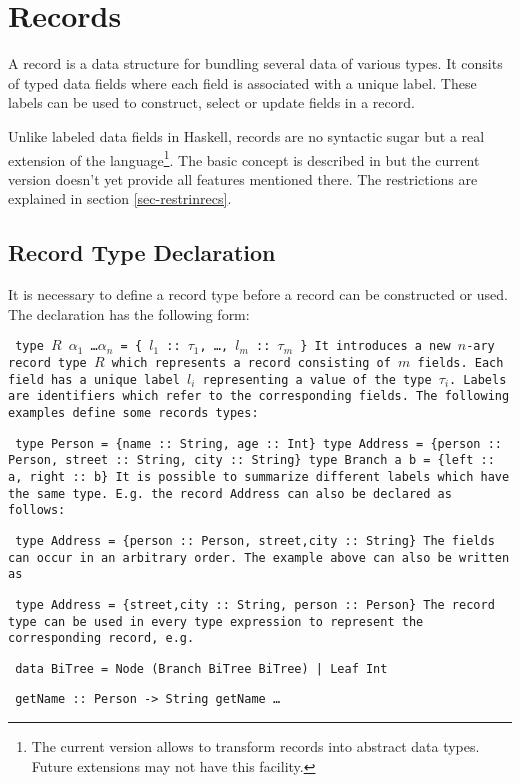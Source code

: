 \documentclass[11pt,fleqn]{article}
\makeatletter
\newenvironment{prog}{\par\vspace{1.5ex}
\setlength{\parindent}{1.0cm}
\setlength{\parskip}{-0.1ex}
\obeylines\@vobeyspaces\tt}{\vspace{1.5ex}\noindent
}
\newcommand{\startprog}{\begin{prog}}
\newcommand{\stopprog}{\end{prog}\noindent}
\newcommand{\pr}[1]{\mbox{\tt #1}}   %
\makeatother
\begin{document}

\section {Records}
\label{records}

A record is a data structure for bundling several data of various types.
It consits of typed data fields where each field is associated with
a unique label. These labels can be used to construct, select or update
fields in a record.


Unlike labeled data fields in Haskell, records are 
no syntactic sugar but a real extension of the
language\footnote{
  The current version allows to transform records
  into abstract data types. Future extensions may not have
  this facility.}.
The basic concept is described in \cite{Leijen05} but the current
version doesn't yet provide all features mentioned there. 
The restrictions are explained in section \ref{sec-restrinrecs}.

 
\subsection{Record Type Declaration}
\label{sec-recordtypedecl}

It is necessary to define a record type before a record
can be constructed or used. The declaration has the following form:
\startprog
type $R$ $\alpha_1$ \ldots $\alpha_n$ = \{ $l_1$ :: $\tau_1$, \ldots, $l_m$ :: $\tau_m$ \}
\stopprog
It introduces a new $n$-ary record type $R$ which represents a
record consisting of $m$ fields. Each field has a unique label $l_i$ 
representing a value of the type $\tau_i$. Labels
are identifiers which refer to the corresponding
fields. The following examples define some records types:
\startprog
type Person = \{name :: String, age :: Int\}
type Address = \{person :: Person, street :: String, city :: String\}
type Branch a b = \{left :: a, right :: b\}
\stopprog
It is possible to summarize different labels which have the same
type. E.g. the record \pr{Address} can also be declared as follows:
\startprog
type Address = \{person :: Person, street,city :: String\}
\stopprog
The fields can occur in an arbitrary order. The example above
can also be written as
\startprog
type Address = \{street,city :: String, person :: Person\}
\stopprog
The record type can be used in every type expression to represent
the corresponding record, e.g.
\startprog
data BiTree = Node (Branch BiTree BiTree) | Leaf Int
\stopprog
\startprog
getName :: Person -> String
getName \ldots
\stopprog
\end{document}
